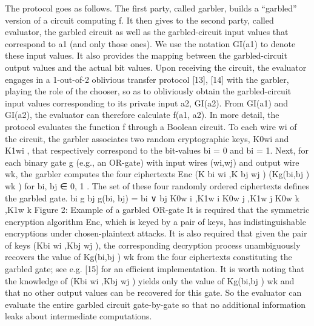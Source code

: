 The protocol goes as follows. The first party, called
garbler, builds a “garbled” version of a circuit computing f.
It then gives to the second party, called evaluator, the
garbled circuit as well as the garbled-circuit input values that
correspond to a1 (and only those ones). We use the notation
GI(a1) to denote these input values. It also provides the
mapping between the garbled-circuit output values and the
actual bit values. Upon receiving the circuit, the evaluator
engages in a 1-out-of-2 oblivious transfer protocol [13],
[14] with the garbler, playing the role of the chooser, so
as to obliviously obtain the garbled-circuit input values
corresponding to its private input a2, GI(a2). From GI(a1)
and GI(a2), the evaluator can therefore calculate f(a1, a2).
In more detail, the protocol evaluates the function f
through a Boolean circuit. To each wire wi of the circuit, the
garbler associates two random cryptographic keys, K0wi
and
K1wi
, that respectively correspond to the bit-values bi = 0
and bi = 1. Next, for each binary gate g (e.g., an OR-gate)
with input wires (wi,wj) and output wire wk, the garbler
computes the four ciphertexts
Enc
(K
bi
wi
,K
bj
wj )
(Kg(bi,bj )
wk ) for bi, bj ∈ {0, 1} .
The set of these four randomly ordered ciphertexts defines
the garbled gate.
bi g
bj
g(bi, bj) = bi ∨ bj
K0w
i
,K1w
i
K0w
j
,K1w
j
K0w
k
,K1w
k
Figure 2: Example of a garbled OR-gate
It is required that the symmetric encryption algorithm
Enc, which is keyed by a pair of keys, has indistinguishable
encryptions under chosen-plaintext attacks. It is also
required that given the pair of keys (Kbi
wi ,Kbj
wj ), the corresponding
decryption process unambiguously recovers the
value of Kg(bi,bj )
wk from the four ciphertexts constituting the
garbled gate; see e.g. [15] for an efficient implementation.
It is worth noting that the knowledge of (Kbi
wi ,Kbj
wj ) yields
only the value of Kg(bi,bj )
wk and that no other output values
can be recovered for this gate. So the evaluator can evaluate
the entire garbled circuit gate-by-gate so that no additional
information leaks about intermediate computations.






